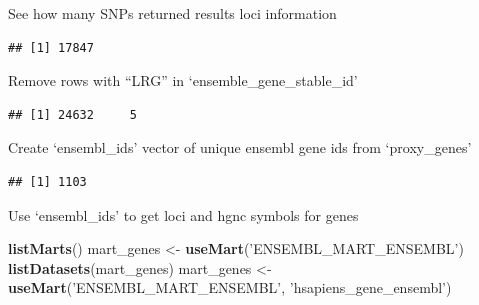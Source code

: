 \documentclass[]{article}
\newenvironment{Shaded}{\begin{snugshade}}{\end{snugshade}}
\newcommand{\KeywordTok}[1]{\textcolor[rgb]{0.13,0.29,0.53}{\textbf{#1}}}
\newcommand{\StringTok}[1]{\textcolor[rgb]{0.31,0.60,0.02}{#1}}
\newcommand{\OperatorTok}[1]{\textcolor[rgb]{0.81,0.36,0.00}{\textbf{#1}}}
\newcommand{\NormalTok}[1]{#1}
\begin{document}
See how many SNPs returned results loci information

\begin{Shaded}
\end{Shaded}

\begin{verbatim}
## [1] 17847
\end{verbatim}

Remove rows with ``LRG'' in `ensemble\_gene\_stable\_id'

\begin{Shaded}
\end{Shaded}

\begin{verbatim}
## [1] 24632     5
\end{verbatim}

Create `ensembl\_ids' vector of unique ensembl gene ids from
`proxy\_genes'

\begin{Shaded}
\end{Shaded}

\begin{verbatim}
## [1] 1103
\end{verbatim}

Use `ensembl\_ids' to get loci and hgnc symbols for genes

\begin{Shaded}
\begin{Highlighting}[]
\KeywordTok{listMarts}\NormalTok{()}
\NormalTok{mart_genes <-}\StringTok{ }\KeywordTok{useMart}\NormalTok{(}\StringTok{'ENSEMBL_MART_ENSEMBL'}\NormalTok{)}
\KeywordTok{listDatasets}\NormalTok{(mart_genes)}
\NormalTok{mart_genes <-}\StringTok{ }\KeywordTok{useMart}\NormalTok{(}\StringTok{'ENSEMBL_MART_ENSEMBL'}\NormalTok{, }\StringTok{'hsapiens_gene_ensembl'}\NormalTok{)}
\end{Highlighting}
\end{Shaded}
\end{document}

